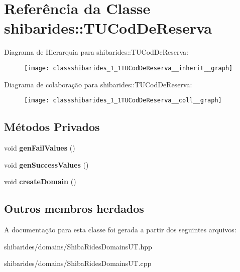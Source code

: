 \hypertarget{classshibarides_1_1TUCodDeReserva}{}\section{Referência da Classe shibarides\+:\+:T\+U\+Cod\+De\+Reserva}
\label{classshibarides_1_1TUCodDeReserva}


Diagrama de Hierarquia para shibarides\+:\+:T\+U\+Cod\+De\+Reserva\+:\nopagebreak
\begin{figure}[H]
\begin{center}
\leavevmode
\texttt{[image: classshibarides\_1\_1TUCodDeReserva\_\_inherit\_\_graph]}
\end{center}
\end{figure}


Diagrama de colaboração para shibarides\+:\+:T\+U\+Cod\+De\+Reserva\+:\nopagebreak
\begin{figure}[H]
\begin{center}
\leavevmode
\texttt{[image: classshibarides\_1\_1TUCodDeReserva\_\_coll\_\_graph]}
\end{center}
\end{figure}
\subsection*{Métodos Privados}
\begin{DoxyCompactItemize}
\item 
void {\bfseries gen\+Fail\+Values} ()\hypertarget{classshibarides_1_1TUCodDeReserva_a76b950ff521e9027410554ca9f57a75e}{}\label{classshibarides_1_1TUCodDeReserva_a76b950ff521e9027410554ca9f57a75e}

\item 
void {\bfseries gen\+Success\+Values} ()\hypertarget{classshibarides_1_1TUCodDeReserva_a2947a150417b195e862c34114291fe96}{}\label{classshibarides_1_1TUCodDeReserva_a2947a150417b195e862c34114291fe96}

\item 
void {\bfseries create\+Domain} ()\hypertarget{classshibarides_1_1TUCodDeReserva_af81ea709a8dbbebe6c66099698e4a191}{}\label{classshibarides_1_1TUCodDeReserva_af81ea709a8dbbebe6c66099698e4a191}

\end{DoxyCompactItemize}
\subsection*{Outros membros herdados}


A documentação para esta classe foi gerada a partir dos seguintes arquivos\+:\begin{DoxyCompactItemize}
\item 
shibarides/domains/Shiba\+Rides\+Domains\+U\+T.\+hpp\item 
shibarides/domains/Shiba\+Rides\+Domains\+U\+T.\+cpp\end{DoxyCompactItemize}
